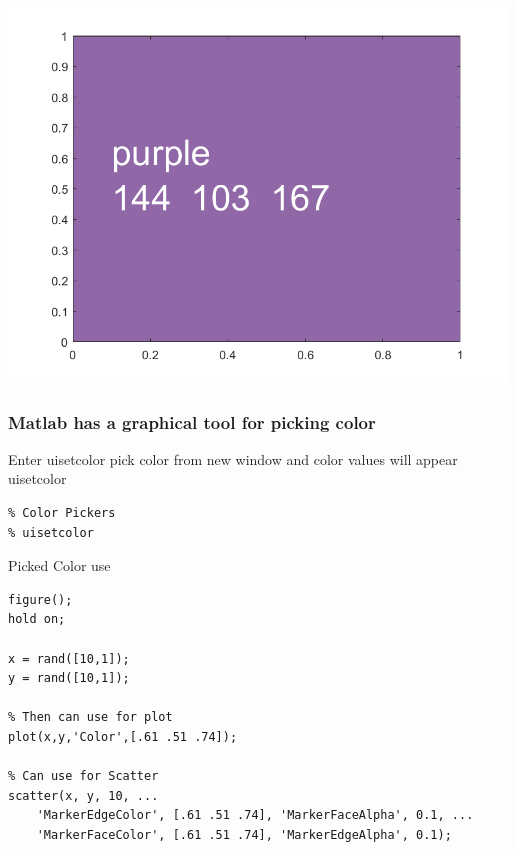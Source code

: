 \documentclass[
]{book}
\begin{document}
\includegraphics[width=5.20833in,height=\textheight]{img/fs_color_images/figure_11.png}

\hypertarget{matlab-has-a-graphical-tool-for-picking-color}{%
\subsubsection{Matlab has a graphical tool for picking color}\label{matlab-has-a-graphical-tool-for-picking-color}}

Enter uisetcolor pick color from new window and color values will appear
uisetcolor

\begin{verbatim}
% Color Pickers
% uisetcolor
\end{verbatim}

Picked Color use

\begin{verbatim}
figure();
hold on;

x = rand([10,1]);
y = rand([10,1]);

% Then can use for plot
plot(x,y,'Color',[.61 .51 .74]);

% Can use for Scatter
scatter(x, y, 10, ...
    'MarkerEdgeColor', [.61 .51 .74], 'MarkerFaceAlpha', 0.1, ...
    'MarkerFaceColor', [.61 .51 .74], 'MarkerEdgeAlpha', 0.1);
\end{verbatim}
\end{document}
